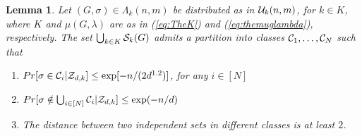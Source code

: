\documentclass[a4paper,10pt]{article}
\newtheorem{lemma}{Lemma}\renewcommand{\thelemma}{\arabic{lemma}}
\newcommand\cZ{\mathcal{Z}}
\begin{document}
\begin{lemma}\label{lemma:ShateringTubeTest}
Let $(G, \sigma)\in \Lambda_k(n,m)$ be distributed as in ${\cal U}_k(n,m)$,
for $k\in K $, where $K$ and $\mu(G,\lambda)$ are as in (\ref{eq:TheK}) and 
(\ref{eq:themuglambda}), respectively.
The set $\bigcup_{k\in K}{\cal S}_k(G)$ admits a partition into classes 
${\cal C}_1, \ldots, {\cal C}_N$ such that
\begin{enumerate}
\item $Pr[\sigma \in {\cal C}_i|\cZ_{d,k}]\leq\exp[-n/(2d^{1.2})]$, for any $i \in [N]$
\item $Pr[\sigma \notin \bigcup_{i\in [N]} {\cal C}_i|\cZ_{d,k}]\leq\exp(-n/d)$
\item The distance between two independent sets in different classes is at least $2$.
\end{enumerate}
\end{lemma}
\end{document}
